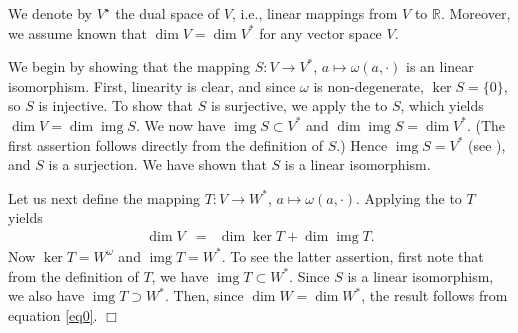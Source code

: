 \documentclass[12pt]{article}
\begin{document}
\newcommand{\image}{\mathop{\mathrm{img}}}
We denote by $V^\star$ the dual space of $V$, i.e.,
linear mappings from $V$ to $\mathbb{R}$. Moreover, we assume known that
$\dim V = \dim V^\ast$ for any vector space $V$.

We begin by showing that the
mapping $S: V \to V^*$, $a \mapsto \omega(a,\cdot)$
is an linear isomorphism. First, linearity is clear, and since
$\omega$ is non-degenerate, $\ker S=\{0\}$, so $S$ is injective.
To show that $S$ is surjective, we apply the 
 to
$S$, which yields $\dim V = \dim \image S$.
We now have
$\image S \subset V^*$
and
$\dim \image S = \dim V^\ast$.
(The first assertion follows directly from the definition of $S$.)
Hence $\image S = V^\ast$ (see ),
and $S$ is a surjection. We have shown that
$S$ is a linear isomorphism.

Let us next define the mapping $T: V\to W^*$, $a\mapsto \omega(a,\cdot)$.
Applying the   to $T$ yields
\begin{eqnarray}
\label{eq0}
\dim V &=& \dim \ker T + \dim \image T.
\end{eqnarray}
Now  $\ker T = W^\omega$ and $ \image T = W^*$.
To see the latter assertion, first note that from the definition of $T$, we
have $\image T \subset W^*$. Since $S$ is a linear
isomorphism, we also have $\image T \supset W^*$.
Then, since $\dim W= \dim W^*$,
the result follows from equation \ref{eq0}. $\Box$
\end{document}
